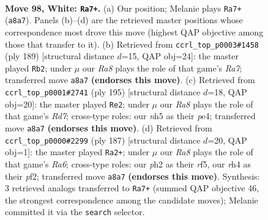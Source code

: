 \documentclass[11pt]{article}
\begin{document}
\clearpage

\begin{figure}[p]\centering
\begin{subfigure}{0.46\textwidth}\centering
\resizebox{\linewidth}{!}{%
\newchessgame
\chessboard[
  setfen={R7/2k5/8/7n/p6r/P7/7p/7K w - - 22 98},
  showmover=false,
  pgfstyle=straightmove, color=movearrow, markmove={a8-a7}
]}
\caption{}
\end{subfigure}\hfill
\begin{subfigure}{0.46\textwidth}\centering
\resizebox{\linewidth}{!}{%
\newchessgame
\chessboard[
  setfen={8/8/4K3/pPk5/P5R1/8/r7/8 b - - 88 95},
  showmover=false,
  pgfstyle=straightmove, color=movearrow, markmove={a2-b2}
]}
\caption{}
\end{subfigure}
\\[4pt]
\begin{subfigure}{0.46\textwidth}\centering
\resizebox{\linewidth}{!}{%
\newchessgame
\chessboard[
  setfen={8/6k1/4R1P1/2K5/4P3/8/3r4/8 b - - 72 98},
  showmover=false,
  pgfstyle=straightmove, color=movearrow, markmove={d2-e2}
]}
\caption{}
\end{subfigure}\hfill
\begin{subfigure}{0.46\textwidth}\centering
\resizebox{\linewidth}{!}{%
\newchessgame
\chessboard[
  setfen={8/8/7k/5R2/6p1/r5P1/3K1P2/8 b - - 93 94},
  showmover=false,
  pgfstyle=straightmove, color=movearrow, markmove={a3-a2}
]}
\caption{}
\end{subfigure}
\caption{\textbf{Move 98, White: \texttt{Ra7+}.} (a) Our position; Melanie plays \texttt{Ra7+} (\texttt{a8a7}). Panels (b)--(d) are the retrieved master positions whose correspondence most drove this move (highest QAP objective among those that transfer to it). (b) Retrieved from \texttt{ccrl\_top\_p0003\#1458} (ply 189) [structural distance $d$=15, QAP obj=24]: the master played \texttt{Rb2}; under $\mu$ our \emph{Ra8} plays the role of that game's \emph{Ra7}; transferred move \texttt{a8a7} \textbf{(endorses this move)}. (c) Retrieved from \texttt{ccrl\_top\_p0001\#2741} (ply 195) [structural distance $d$=18, QAP obj=20]: the master played \texttt{Re2}; under $\mu$ our \emph{Ra8} plays the role of that game's \emph{Rd7}; cross-type roles: our \emph{n}h5 as their \emph{p}e4; transferred move \texttt{a8a7} \textbf{(endorses this move)}. (d) Retrieved from \texttt{ccrl\_top\_p0000\#2299} (ply 187) [structural distance $d$=20, QAP obj=1]: the master played \texttt{Ra2+}; under $\mu$ our \emph{Ra8} plays the role of that game's \emph{Ra6}; cross-type roles: our \emph{p}h2 as their \emph{r}f5, our \emph{r}h4 as their \emph{p}f2; transferred move \texttt{a8a7} \textbf{(endorses this move)}. Synthesis: 3 retrieved analogs transferred to \texttt{Ra7+} (summed QAP objective 46, the strongest correspondence among the candidate moves); Melanie committed it via the \texttt{search} selector.}
\label{fig:thought-m194}
\end{figure}
\end{document}
